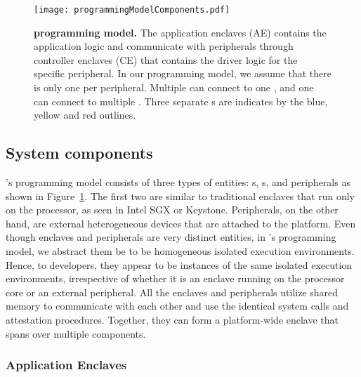 \begin{figure}[t]
\centering
\texttt{[image: programmingModelComponents.pdf]}
\caption{\textbf{\name programming model.} The application enclaves (AE) contains the application logic and communicate with peripherals through controller enclaves (CE) that contains the driver logic for the specific peripheral. In our programming model, we assume that there is only one \ce per peripheral. Multiple \app can connect to one \ce{}, and one \app can connect to multiple \ce. Three separate \nameenclave{}s are indicates by the blue, yellow and red outlines.}
\label{fig:programmingModelComponents}
\end{figure}

\subsection{System components}
\label{sec:programmingModel:systemComponents}

\name's programming model consists of three types of entities: \app{}s, \ce{}s, and peripherals as shown in Figure~\ref{fig:programmingModelComponents}. The first two are similar to traditional enclaves that run only on the processor, as seen in Intel SGX or Keystone. Peripherals, on the other hand, are external heterogeneous devices that are attached to the platform. Even though enclaves and peripherals are very distinct entities, in \name's programming model, we abstract them be to be homogeneous isolated execution environments. Hence, to developers, they appear to be instances of the same isolated execution environments, irrespective of whether it is an enclave running on the processor core or an external peripheral. All the enclaves and peripherals utilize shared memory to communicate with each other and use the identical system calls and attestation procedures. Together, they can form a platform-wide enclave that spans over multiple components.


\subsubsection{Application Enclaves} 
\label{sec:programmingModel:systemComponents:ae}

